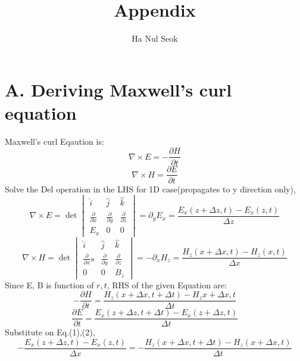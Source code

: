 \documentclass{article}
\title{Appendix}
\begin{document}
\author{Ha Nul Seok}
\maketitle
\section*{A. Deriving Maxwell's curl equation}
Maxwell's curl Eqaution is:
\begin{equation}
    \nabla \times E = - \frac{\partial H}{\partial t}
\end{equation}
\begin{equation}
    \nabla \times H =  \frac{\partial E}{\partial t}
\end{equation}
Solve the Del operation in the LHS for 1D case(propagates to y direction only),
\begin{equation}
    \nabla \times E = \det\begin{vmatrix}
                            \hat{i} & \hat{j} & \hat{k} \\
                            \frac{\partial}{\partial x} & \frac{\partial}{\partial y} & \frac{\partial}{\partial z} \\
                            E_x & 0 & 0
    \end{vmatrix}
    =\partial_y E_x = \frac{E_x(z+\Delta z,t)-E_x(z,t)}{\Delta z}
\end{equation}
\begin{equation}
    \nabla \times H = \det\begin{vmatrix}
                            \hat{i} & \hat{j} & \hat{k} \\
                            \frac{\partial}{\partial x}s & \frac{\partial}{\partial y} & \frac{\partial}{\partial z} \\
                            0 & 0 & B_z
    \end{vmatrix}
    = -\partial_x H_z = \frac{H_z(x+\Delta x,t)-H_z(x,t)}{\Delta x}
\end{equation}
Since E, B is function of $r,t$, RHS of the given Equation are:
\begin{equation}
    - \frac{\partial H}{\partial t} = \frac{H_z(x+\Delta x , t + \Delta t)-H_z{x+\Delta x, t}}{\Delta t}
\end{equation}
\begin{equation}
    \frac{\partial E}{\partial t} = \frac{E_x(z+\Delta z , t + \Delta t)-E_x(z+\Delta z, t)}{\Delta t}
\end{equation}
Substitute on Eq.(1),(2),
\begin{equation}
    -\frac{E_x(z+\Delta z,t)-E_x(z,t)}{\Delta x} =  -\frac{H_z(x+\Delta x , t + \Delta t)-H_z(x+\Delta x, t)}{\Delta t}
\end{equation}
\end{document}
